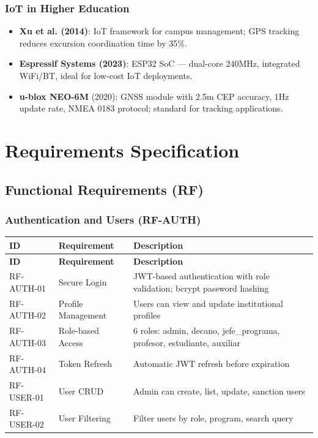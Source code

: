 \documentclass[12pt,a4paper]{report}
\begin{document}
\subsection{IoT in Higher Education}
\begin{itemize}
    \item \textbf{Xu et al. (2014)}: IoT framework for campus management; GPS tracking reduces excursion coordination time by 35\%.
    \item \textbf{Espressif Systems (2023)}: ESP32 SoC — dual-core 240MHz, integrated WiFi/BT, ideal for low-cost IoT deployments.
    \item \textbf{u-blox NEO-6M} (2020): GNSS module with 2.5m CEP accuracy, 1Hz update rate, NMEA 0183 protocol; standard for tracking applications.
\end{itemize}

\chapter{Requirements Specification}

\section{Functional Requirements (RF)}

\subsection{Authentication and Users (RF-AUTH)}
\begin{longtable}{|p{2.5cm}|p{3.5cm}|p{7cm}|}
\hline
\textbf{ID} & \textbf{Requirement} & \textbf{Description} \\
\hline
\endfirsthead
\hline \textbf{ID} & \textbf{Requirement} & \textbf{Description} \\ \hline \endhead
RF-AUTH-01 & Secure Login & JWT-based authentication with role validation; bcrypt password hashing \\
\hline
RF-AUTH-02 & Profile Management & Users can view and update institutional profiles \\
\hline
RF-AUTH-03 & Role-based Access & 6 roles: admin, decano, jefe\_programa, profesor, estudiante, auxiliar \\
\hline
RF-AUTH-04 & Token Refresh & Automatic JWT refresh before expiration \\
\hline
RF-USER-01 & User CRUD & Admin can create, list, update, sanction users \\
\hline
RF-USER-02 & User Filtering & Filter users by role, program, search query \\
\hline
\end{longtable}
\end{document}
